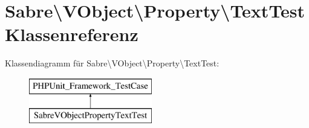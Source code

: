 \hypertarget{class_sabre_1_1_v_object_1_1_property_1_1_text_test}{}\section{Sabre\textbackslash{}V\+Object\textbackslash{}Property\textbackslash{}Text\+Test Klassenreferenz}
\label{class_sabre_1_1_v_object_1_1_property_1_1_text_test}
Klassendiagramm für Sabre\textbackslash{}V\+Object\textbackslash{}Property\textbackslash{}Text\+Test\+:\begin{figure}[H]
\begin{center}
\leavevmode
\includegraphics[height=2.000000cm]{class_sabre_1_1_v_object_1_1_property_1_1_text_test}
\end{center}
\end{figure}
